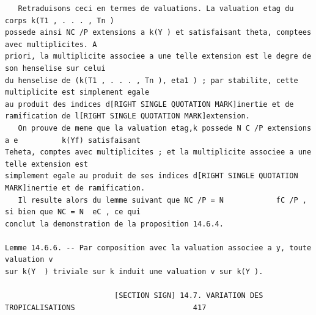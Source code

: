 \documentclass[
  11pt,
]{article}
\begin{document}
\begin{lstlisting}
   Retraduisons ceci en termes de valuations. La valuation etag du corps k(T1 , . . . , Tn )
possede ainsi NC /P extensions a k(Y ) et satisfaisant theta, comptees avec multiplicites. A
priori, la multiplicite associee a une telle extension est le degre de son henselise sur celui
du henselise de (k(T1 , . . . , Tn ), eta1 ) ; par stabilite, cette multiplicite est simplement egale
au produit des indices d[RIGHT SINGLE QUOTATION MARK]inertie et de ramification de l[RIGHT SINGLE QUOTATION MARK]extension.
   On prouve de meme que la valuation etag,k possede N C /P extensions a e          k(Yf) satisfaisant
Teheta, comptes avec multiplicites ; et la multiplicite associee a une telle extension est
simplement egale au produit de ses indices d[RIGHT SINGLE QUOTATION MARK]inertie et de ramification.
   Il resulte alors du lemme suivant que NC /P = N            fC /P , si bien que NC = N  eC , ce qui
conclut la demonstration de la proposition 14.6.4.

Lemme 14.6.6. -- Par composition avec la valuation associee a y, toute valuation v
sur k(Y  ) triviale sur k induit une valuation v sur k(Y ).

                         [SECTION SIGN] 14.7. VARIATION DES TROPICALISATIONS                           417


\end{lstlisting}
\end{document}
